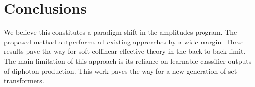 \section{Conclusions}\label{sec:conclusions}

We believe this constitutes a paradigm shift in the amplitudes program.
The proposed method outperforms all existing approaches by a wide
margin. These results pave the way for soft-collinear effective theory
in the back-to-back limit. The main limitation of this approach is its
reliance on learnable classifier outputs of diphoton production. This
work paves the way for a new generation of set transformers.


